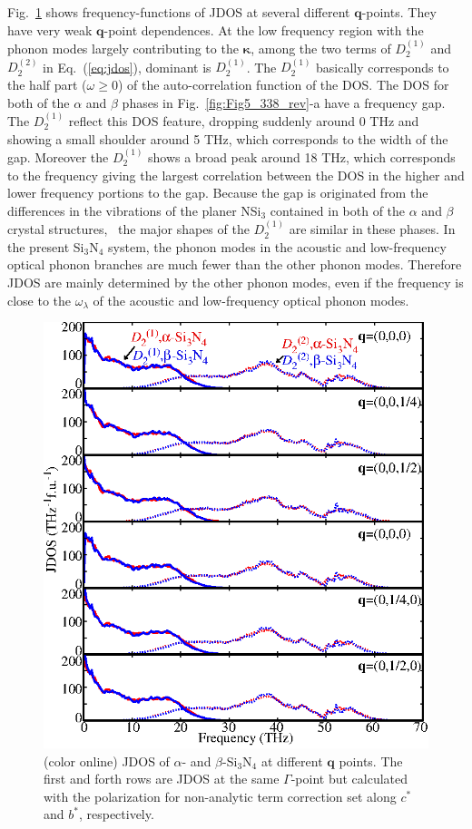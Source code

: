 \documentclass[twocolumn,amsmath,amssymb,a4paper,prb,superscriptaddress,floatfix]{revtex4-1}
\begin{document}
Fig.~\ref{fig:Fig6_338} shows frequency-functions of JDOS at several different
$\mathbf{q}$-points. They have very weak $\mathbf{q}$-point dependences. At the
low frequency region with the phonon modes largely contributing to the
$\boldsymbol{\kappa}$, among the two terms of $D_2^{(1)}$ and $D_2^{(2)}$ in
Eq.~(\ref{eq:jdos}), dominant is $D_2^{(1)}$.  The $D_2^{(1)}$ basically
corresponds to the half part ($\omega \geq  0$) of the auto-correlation function
of the DOS. The DOS for both of the $\alpha$ and $\beta$ phases in
Fig.~\ref{fig:Fig5_338_rev}-a have a frequency gap. The $D_2^{(1)}$ reflect this
DOS feature, dropping suddenly around 0 THz and showing a small shoulder around
5 THz, which corresponds to the width of the gap.  Moreover the $D_2^{(1)}$
shows a broad peak around 18 THz, which corresponds to the frequency giving the
largest correlation between the DOS in the higher and lower frequency portions
to the gap.  Because the gap is originated from the differences in the
vibrations of the planer NSi$_3$ contained in both of the $\alpha$ and $\beta$
crystal structures,~\cite{kuwabara} the major shapes of the $D_2^{(1)}$ are
similar in these phases.  In the present Si$_3$N$_4$ system, the phonon modes in
the acoustic and low-frequency optical phonon branches are much fewer than the
other phonon modes.  Therefore JDOS are mainly determined by the other phonon
modes, even if the frequency is close to the $\omega_\lambda$ of the acoustic
and low-frequency optical phonon modes.

\begin{figure}[ht]
 \centering
  \includegraphics[width=0.9\linewidth]{figure_jdoss.eps} \caption{(color
	  online) JDOS of $\alpha$- and $\beta$-Si$_3$N$_4$ at different $\mathbf q$ points.
  The first and forth rows are JDOS at the same $\Gamma$-point but calculated
  with the polarization for non-analytic term correction set along $c^*$ and
  $b^*$, respectively. \label{fig:Fig6_338} }
 \centering
\end{figure}
\end{document}
